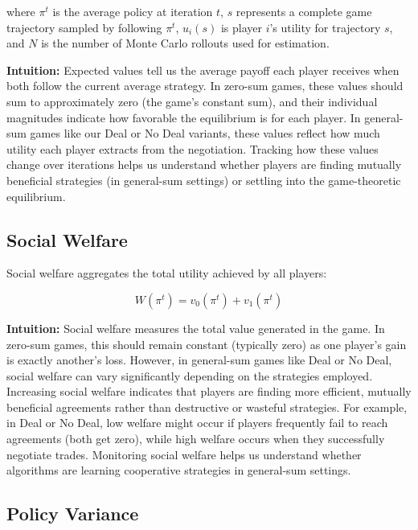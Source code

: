\documentclass[11pt]{article}
\begin{document}
where $\pi^t$ is the average policy at iteration $t$, $s$ represents a complete game trajectory sampled by following $\pi^t$, $u_i(s)$ is player $i$'s utility for trajectory $s$, and $N$ is the number of Monte Carlo rollouts used for estimation.

\textbf{Intuition:} Expected values tell us the average payoff each player receives when both follow the current average strategy. In zero-sum games, these values should sum to approximately zero (the game's constant sum), and their individual magnitudes indicate how favorable the equilibrium is for each player. In general-sum games like our Deal or No Deal variants, these values reflect how much utility each player extracts from the negotiation. Tracking how these values change over iterations helps us understand whether players are finding mutually beneficial strategies (in general-sum settings) or settling into the game-theoretic equilibrium.

\newpage

\subsection{Social Welfare}

Social welfare aggregates the total utility achieved by all players:

\begin{equation}
W(\pi^t) = v_0(\pi^t) + v_1(\pi^t)
\end{equation}



\textbf{Intuition:} Social welfare measures the total value generated in the game. In zero-sum games, this should remain constant (typically zero) as one player's gain is exactly another's loss. However, in general-sum games like Deal or No Deal, social welfare can vary significantly depending on the strategies employed. Increasing social welfare indicates that players are finding more efficient, mutually beneficial agreements rather than destructive or wasteful strategies. For example, in Deal or No Deal, low welfare might occur if players frequently fail to reach agreements (both get zero), while high welfare occurs when they successfully negotiate trades. Monitoring social welfare helps us understand whether algorithms are learning cooperative strategies in general-sum settings.

\subsection{Policy Variance}
\end{document}
